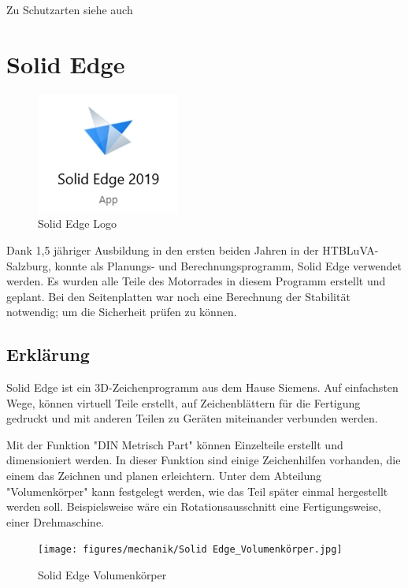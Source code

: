 Zu Schutzarten siehe auch \cite{IPSchutzarten}

\newpage

\section{Solid Edge}


\begin{figure} [H]
	\begin{center}
		\includegraphics[scale=0.5]{figures/mechanik/Untitled.jpg}
			\caption{Solid Edge Logo}
			\label{fig:Solid Edge Logo}
	\end{center}
\end{figure}


Dank 1,5 jähriger Ausbildung in den ersten beiden Jahren in der HTBLuVA-Salzburg, konnte als Planungs- und Berechnungsprogramm, Solid Edge verwendet werden. 
Es wurden alle Teile des Motorrades in diesem Programm erstellt und geplant. Bei den Seitenplatten war noch eine Berechnung der Stabilität notwendig; um die Sicherheit prüfen zu können. 

\subsection{Erklärung}

Solid Edge ist ein 3D-Zeichenprogramm aus dem Hause Siemens. Auf einfachsten Wege, können virtuell Teile erstellt, auf Zeichenblättern für die Fertigung gedruckt und mit anderen Teilen zu Geräten miteinander verbunden werden. 

Mit der Funktion "DIN Metrisch Part" können Einzelteile erstellt und dimensioniert werden. In dieser Funktion sind einige Zeichenhilfen vorhanden, die einem das Zeichnen und planen erleichtern. Unter dem Abteilung "Volumenkörper" kann festgelegt werden, wie das Teil später einmal hergestellt werden soll. Beispielsweise wäre ein Rotationsausschnitt eine Fertigungsweise, einer Drehmaschine.


\begin{figure} [H]
	\begin{center}
		\texttt{[image: figures/mechanik/Solid Edge\_Volumenkörper.jpg]}
			\caption{Solid Edge Volumenkörper}
			\label{fig:Solid Edge Volumenkörper}
	\end{center}
\end{figure}


